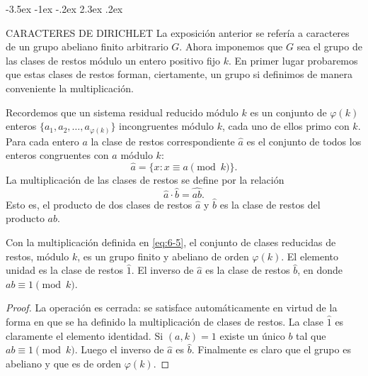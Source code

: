 \documentclass[12pt,a4paper]{book}
\makeatletter
\renewcommand\section{\@startsection{section}{1}{\z@}%
  {-3.5ex \@plus -1ex \@minus -.2ex}%
  {2.3ex \@plus .2ex}%
  {\normalfont\Large\bfseries\raggedright}}
\makeatother
\begin{document}
    \section{CARACTERES DE DIRICHLET}
    La exposición anterior se refería a caracteres de un grupo abeliano finito arbitrario
    $G$. Ahora imponemos que $G$ sea el grupo de las clases de restos módulo un entero
    positivo fijo $k$. En primer lugar probaremos que estas clases de restos forman,
    ciertamente, un grupo si definimos de manera conveniente la multiplicación.

    Recordemos que un sistema residual reducido módulo $k$ es un conjunto de $\varphi(k)$
    enteros $\{a_{1},a_{2},\dots,a_{\varphi(k)}\}$ incongruentes módulo $k$, cada uno de ellos
    primo con $k$. Para cada entero $a$ la clase de restos correspondiente $\hat{a}$ es el
    conjunto de todos los enteros congruentes con $a$ módulo $k$:
    \begin{equation*}
        \hat{a}=\{x:x\equiv a\pmod{k}\}.
    \end{equation*}
    La multiplicación de las clases de restos se define por la relación
    \begin{equation}\label{eq:6-5}
        \hat{a}\cdot\hat{b}=\widehat{ab}.
    \end{equation}
    Esto es, el producto de dos clases de restos $\hat{a}$ y $\hat{b}$ es la clase de
    restos del producto $ab$.

    \begin{teorema}
        Con la multiplicación definida en \eqref{eq:6-5}, el conjunto de clases reducidas
        de restos, módulo $k$, es un grupo finito y abeliano de orden $\varphi(k)$. El
        elemento unidad es la clase de restos $\hat{1}$. El inverso de $\hat{a}$ es la
        clase de restos $\hat{b}$, en donde $ab\equiv1\pmod{k}$.
    \end{teorema}

    \begin{proof}
        La operación es cerrada: se satisface automáticamente en virtud de la forma en que
        se ha definido la multiplicación de clases de restos. La clase $\hat{1}$ es
        claramente el elemento identidad. Si $(a,k)=1$ existe un único $b$ tal que
        $ab\equiv1\pmod{k}$. Luego el inverso de $\hat{a}$ es $\hat{b}$. Finalmente es
        claro que el grupo es abeliano y que es de orden $\varphi(k)$.
    \end{proof}
\end{document}
